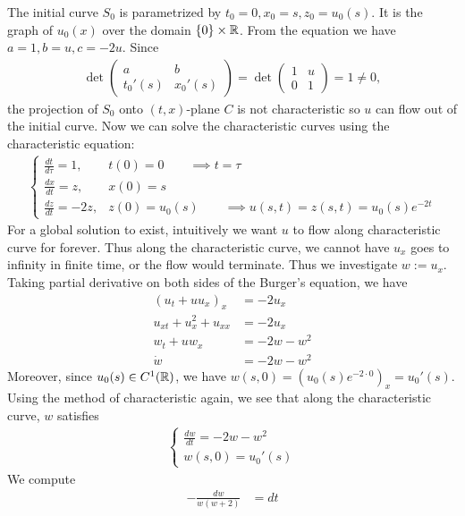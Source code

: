 \documentclass[12pt]{article}
\begin{document}
\begin{problem}[2]
\begin{enumerate}[label=(\alph*)]
The initial curve $ S_0$ is parametrized by $ t_0=0,x_0=s,z_0=u_0(s)$. It is the graph of $ u_0(x)$ over the domain $ \{0\}\times \mathbb{R} $. From the equation we have $ a=1,b=u,c=-2u$. Since
\begin{align*}
	\det \begin{pmatrix} a&b\\t_0'(s)& x_0'(s) \end{pmatrix} = \det \begin{pmatrix} 1&u\\0&1 \end{pmatrix} = 1 \neq 0 ,
\end{align*}
the projection of $ S_0$ onto $ (t,x)$-plane $ C$ is not characteristic so $ u$ can flow out of the initial curve. Now we can solve the characteristic curves using the characteristic equation:
\begin{align*}
	\begin{cases}
		\frac{dt}{ d \tau}=1, & t(0)=0 \qquad  \implies t = \tau\\
		\frac{d x}{d t}= z, & x(0) = s\\
		\frac{d z}{d t} = -2z,& z(0) = u_0(s) \qquad \implies u(s,t)=z(s,t)=u_0(s) e^{-2t}
	\end{cases}
\end{align*}
For a global solution to exist, intuitively we want $ u$ to flow along characteristic curve for forever. Thus along the characteristic curve, we cannot have  $ u_x$ goes to infinity in finite time, or the flow would terminate. Thus we investigate $ w:= u_x$. Taking partial derivative on both sides of the Burger's equation, we have
 \begin{align*}
	 (u_t+u u_x)_x &= -2u_x \\
	 u_{xt}+u_x^2+u_{x x} &= -2u_x \\
	 w_t + u w_x &= -2 w - w^2 \\
	 \dot{w} &= -2w-w^2 
\end{align*}
Moreover, since $ u_0(s) \in C^{1}(\mathbb{R})$, we have $ w(s,0) = \left( u_0 (s) e^{-2 \cdot 0} \right)_x =  u_0'(s)$. Using the method of characteristic again, we see that along the characteristic curve, $ w$ satisfies
\begin{align*}
	\begin{cases}
		\frac{d w}{d t} = -2w-w^2\\
		w(s,0) = u_0'(s)
	\end{cases}
\end{align*}
We compute
\begin{align*}
	- \frac{dw}{ w(w+2)} &= dt \\

\end{align*}
\end{enumerate}
\end{problem}
\end{document}
